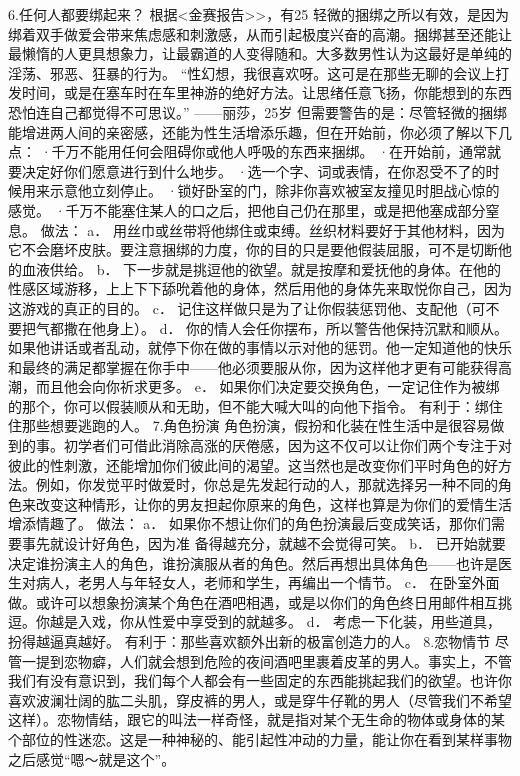\documentclass[12pt,UTF8]{ctexbook}
\begin{document}
6.任何人都要绑起来？
根据<金赛报告>>，有25%
轻微的捆绑之所以有效，是因为绑着双手做爱会带来焦虑感和刺激感，从而引起极度兴奋的高潮。捆绑甚至还能让最懒惰的人更具想象力，让最霸道的人变得随和。大多数男性认为这最好是单纯的淫荡、邪恶、狂暴的行为。
“性幻想，我很喜欢呀。这可是在那些无聊的会议上打发时间，或是在塞车时在车里神游的绝好方法。让思绪任意飞扬，你能想到的东西恐怕连自己都觉得不可思议。”
——丽莎，25岁
但需要警告的是：尽管轻微的捆绑能增进两人间的亲密感，还能为性生活增添乐趣，但在开始前，你必须了解以下几点：
·千万不能用任何会阻碍你或他人呼吸的东西来捆绑。
·在开始前，通常就要决定好你们愿意进行到什么地步。
·选一个字、词或表情，在你忍受不了的时候用来示意他立刻停止。
·锁好卧室的门，除非你喜欢被室友撞见时胆战心惊的感觉。
·千万不能塞住某人的口之后，把他自己仍在那里，或是把他塞成部分窒息。
做法：
a． 用丝巾或丝带将他绑住或束缚。丝织材料要好于其他材料，因为它不会磨坏皮肤。要注意捆绑的力度，你的目的只是要他假装屈服，可不是切断他的血液供给。
b． 下一步就是挑逗他的欲望。就是按摩和爱抚他的身体。在他的性感区域游移，上上下下舔吮着他的身体，然后用他的身体先来取悦你自己，因为这游戏的真正的目的。
c． 记住这样做只是为了让你假装惩罚他、支配他（可不要把气都撒在他身上）。
d． 你的情人会任你摆布，所以警告他保持沉默和顺从。如果他讲话或者乱动，就停下你在做的事情以示对他的惩罚。他一定知道他的快乐和最终的满足都掌握在你手中——他必须要服从你，因为这样他才更有可能获得高潮，而且他会向你祈求更多。
e． 如果你们决定要交换角色，一定记住作为被绑的那个，你可以假装顺从和无助，但不能大喊大叫的向他下指令。
有利于：绑住住那些想要逃跑的人。
7.角色扮演
角色扮演，假扮和化装在性生活中是很容易做到的事。初学者们可借此消除高涨的厌倦感，因为这不仅可以让你们两个专注于对彼此的性刺激，还能增加你们彼此间的渴望。这当然也是改变你们平时角色的好方法。例如，你发觉平时做爱时，你总是先发起行动的人，那就选择另一种不同的角色来改变这种情形，让你的男友担起你原来的角色，这样也算是为你们的爱情生活增添情趣了。
做法：
a． 如果你不想让你们的角色扮演最后变成笑话，那你们需要事先就设计好角色，因为准 备得越充分，就越不会觉得可笑。
b． 已开始就要决定谁扮演主人的角色，谁扮演服从者的角色。然后再想出具体角色——也许是医生对病人，老男人与年轻女人，老师和学生，再编出一个情节。
c． 在卧室外面做。或许可以想象扮演某个角色在酒吧相遇，或是以你们的角色终日用邮件相互挑逗。你越是入戏，你从性爱中享受到的就越多。
d． 考虑一下化装，用些道具，扮得越逼真越好。
有利于：那些喜欢额外出新的极富创造力的人。
8.恋物情节
尽管一提到恋物癖，人们就会想到危险的夜间酒吧里裹着皮革的男人。事实上，不管我们有没有意识到，我们每个人都会有一些固定的东西能挑起我们的欲望。也许你喜欢波澜壮阔的肱二头肌，穿皮裤的男人，或是穿牛仔靴的男人（尽管我们不希望这样）。恋物情结，跟它的叫法一样奇怪，就是指对某个无生命的物体或身体的某个部位的性迷恋。这是一种神秘的、能引起性冲动的力量，能让你在看到某样事物之后感觉“嗯～就是这个”。
\end{document}
